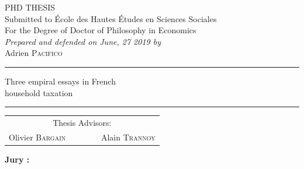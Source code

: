 \begin{center}
\large {\sc PHD THESIS\\} \small \vspace{0.1cm}
Submitted to École des Hautes Études en Sciences Sociales\\
For the Degree of Doctor of Philosophy in Economics\\
\vspace{1cm}
\emph{Prepared and defended %
on June, 27 2019 by}\\
\vspace{0.1cm}
\large
Adrien \textsc{Pacifico} \\
\normalsize \vspace{0.3cm}

\textcolor[RGB]{220,220,220}{\rule{0.5\linewidth}{1pt}}
\vspace{0.1cm}

\LARGE  {\sc Three empiral essays in French \\} 
\LARGE {\sc household taxation\\}\normalsize 

\vspace{0.1cm}
\textcolor[RGB]{220,220,220}{\rule{0.5\linewidth}{1pt}}


\vspace{1cm}
\begin{tabular}{cc}
\multicolumn{2}{c}{Thesis Advisors:} \\
Olivier \textsc{Bargain} ~~~ & ~~~Alain \textsc{Trannoy}
\end{tabular}



\vspace{1cm}
\bfseries Jury \normalfont :\\


\end{center}



